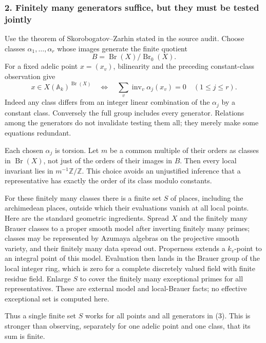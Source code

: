 \documentclass[11pt]{article}
\begin{document}
\subsubsection{2. Finitely many generators suffice, but they must be tested jointly}
Use the theorem of Skorobogatov--Zarhin stated in the source audit. Choose classes $\alpha_1,\ldots,\alpha_r$ whose images generate the finite quotient
\[
 B=\operatorname{Br}(X)/\operatorname{Br}_0(X).
\]
For a fixed adelic point $x=(x_v)$, bilinearity and the preceding constant-class observation give
\[
 x\in X(\mathbb A_k)^{\operatorname{Br}(X)}
 \quad\Longleftrightarrow\quad
 \sum_v\operatorname{inv}_v\alpha_j(x_v)=0
 \quad(1\le j\le r).                                 \tag{3}
\]
Indeed any class differs from an integer linear combination of the $\alpha_j$ by a constant class. Conversely the full group includes every generator. Relations among the generators do not invalidate testing them all; they merely make some equations redundant.

Each chosen $\alpha_j$ is torsion. Let $m$ be a common multiple of their orders as classes in $\operatorname{Br}(X)$, not just of the orders of their images in $B$. Then every local invariant lies in
$m^{-1}\mathbb Z/\mathbb Z$. This choice avoids an unjustified inference that a representative has exactly the order of its class modulo constants.

For these finitely many classes there is a finite set $S$ of places, including the archimedean places, outside which their evaluations vanish at all local points. Here are the standard geometric ingredients. Spread $X$ and the finitely many Brauer classes to a proper smooth model after inverting finitely many primes; classes may be represented by Azumaya algebras on the projective smooth variety, and their finitely many data spread out. Properness extends a $k_v$-point to an integral point of this model. Evaluation then lands in the Brauer group of the local integer ring, which is zero for a complete discretely valued field with finite residue field. Enlarge $S$ to cover the finitely many exceptional primes for all representatives. These are external model and local-Brauer facts; no effective exceptional set is computed here.

Thus a single finite set $S$ works for all points and all generators in (3). This is stronger than observing, separately for one adelic point and one class, that its sum is finite.
\end{document}
